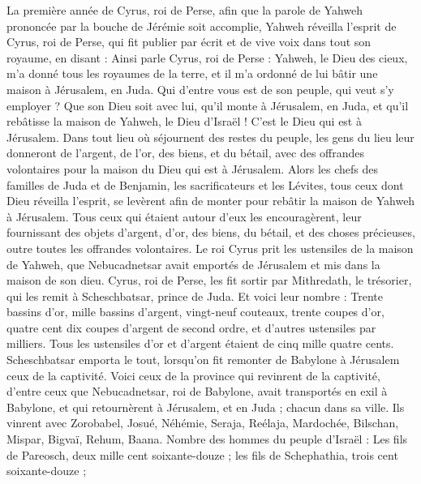 \begin{multicols}{2}
\VerseOne{}La première année de Cyrus, roi de Perse, afin que la parole de Yahweh prononcée par la bouche de Jérémie soit accomplie,  Yahweh réveilla l'esprit de Cyrus, roi de Perse, qui fit publier par écrit et de vive voix dans tout son royaume, en disant :
Ainsi parle Cyrus, roi de Perse : Yahweh, le Dieu des cieux, m'a donné tous les royaumes de la terre, et il m'a ordonné de lui bâtir une maison à Jérusalem, en Juda.
Qui d'entre vous est de son peuple, qui veut s'y employer ? Que son Dieu soit avec lui, qu'il monte à Jérusalem, en Juda, et qu'il rebâtisse la maison de Yahweh, le Dieu d'Israël ! C'est le Dieu qui est à Jérusalem.
Dans tout lieu où séjournent des restes du peuple,  les gens du lieu leur donneront de l’argent, de l’or, des biens, et du bétail, avec des offrandes volontaires pour la maison du Dieu qui est à Jérusalem.
Alors les chefs des familles de Juda et de Benjamin, les sacrificateurs et les Lévites, tous ceux dont Dieu réveilla l'esprit, se levèrent afin de monter pour rebâtir la maison de Yahweh à Jérusalem.
Tous ceux qui étaient autour d'eux les encouragèrent, leur fournissant des objets d'argent, d'or, des biens, du bétail, et des choses précieuses, outre toutes les offrandes volontaires.
Le roi Cyrus prit les ustensiles de la maison de Yahweh, que Nebucadnetsar avait emportés de Jérusalem et mis dans la maison de son dieu.
Cyrus, roi de Perse, les fit sortir par Mithredath, le trésorier, qui les remit à Scheschbatsar, prince de Juda.
Et voici leur nombre : Trente bassins d'or, mille bassins d'argent, vingt-neuf couteaux,
trente coupes d'or, quatre cent dix coupes d'argent de second ordre, et d'autres ustensiles par milliers.
Tous les ustensiles d'or et d'argent étaient de cinq mille quatre cents. Scheschbatsar emporta le tout, lorsqu’on fit remonter de Babylone à Jérusalem ceux de la captivité.
\VerseOne{}Voici ceux de la province qui revinrent de la captivité, d'entre ceux que Nebucadnetsar, roi de Babylone, avait transportés en exil à Babylone, et qui retournèrent à Jérusalem, et en Juda ; chacun dans sa ville.
Ils vinrent avec Zorobabel, Josué, Néhémie, Seraja, Reélaja, Mardochée, Bilschan, Mispar, Bigvaï, Rehum, Baana. Nombre des hommes du peuple d'Israël :
Les fils de Pareosch, deux mille cent soixante-douze ;
les fils de Schephathia, trois cent soixante-douze ;

\end{multicols}
